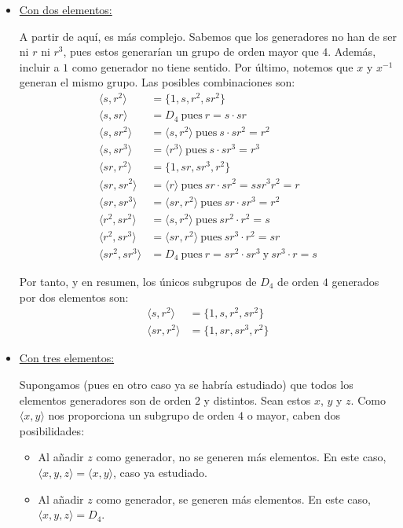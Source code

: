 \begin{ejercicio}
\begin{enumerate}
\begin{itemize}
            \item \ul{Con dos elementos:}
            
            A partir de aquí, es más complejo. Sabemos que los generadores no han de ser ni $r$ ni $r^3$, pues estos generarían un grupo de orden mayor que $4$. Además, incluir a $1$ como generador no tiene sentido. Por último, notemos que $x$ y $x^{-1}$ generan el mismo grupo. Las posibles combinaciones son:
            \begin{align*}
                \langle s, r^2\rangle &= \{1,s,r^2,sr^2\}\\
                \langle s, sr\rangle &= D_4\ \text{pues}\ r=s\cdot sr\\
                \langle s, sr^2\rangle &= \langle s, r^2\rangle\ \text{pues}\ s\cdot sr^2=r^2\\
                \langle s, sr^3\rangle &= \langle r^3\rangle\ \text{pues}\ s\cdot sr^3=r^3\\
                \langle sr, r^2\rangle &= \{1,sr,sr^3,r^2\}\\
                \langle sr, sr^2\rangle &= \langle r\rangle\ \text{pues}\ sr\cdot sr^2=ssr^3r^2=r\\
                \langle sr, sr^3\rangle &= \langle sr,r^2\rangle\ \text{pues}\ sr\cdot sr^3=r^2\\
                \langle r^2, sr^2\rangle &= \langle s, r^2\rangle\ \text{pues}\ sr^2\cdot r^2=s\\
                \langle r^2, sr^3\rangle &= \langle sr, r^2\rangle\ \text{pues}\ sr^3\cdot r^2=sr\\
                \langle sr^2, sr^3\rangle &= D_4\ \text{pues}\ r=sr^2\cdot sr^3\ \text{y}\ sr^3\cdot r=s
            \end{align*}

            Por tanto, y en resumen, los únicos subgrupos de $D_4$ de orden $4$ generados por dos elementos son:
            \begin{align*}
                \langle s, r^2\rangle &= \{1,s,r^2,sr^2\}\\
                \langle sr, r^2\rangle &= \{1,sr,sr^3,r^2\}
            \end{align*}

            \item \ul{Con tres elementos:}
            
            Supongamos (pues en otro caso ya se habría estudiado) que todos los elementos generadores son de orden $2$ y distintos. Sean estos $x$, $y$ y $z$. Como $\langle x,y\rangle$ nos proporciona un subgrupo de orden $4$ o mayor, caben dos posibilidades:
            \begin{itemize}
                \item Al añadir $z$ como generador, no se generen más elementos. En este caso, $\langle x,y,z\rangle=\langle x,y\rangle$, caso ya estudiado.
                \item Al añadir $z$ como generador, se generen más elementos. En este caso, $\langle x,y,z\rangle=D_4$.
            \end{itemize}


\end{itemize}
\end{enumerate}
\end{ejercicio}
